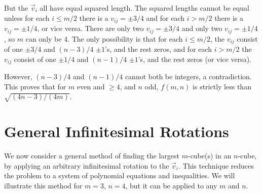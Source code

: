 But the $\vec{v}_i$ all have equal squared length.  The squared lengths cannot
be equal unless for each $i \leq m/2$ there is a $v_{ij} = \pm 3/4$ and for
each $i > m/2$ there is a $v_{ij} = \pm 1/4$, or vice versa.  There are only
two $v_{ij} = \pm 3/4$ and only two $v_{ij} = \pm 1/4$, so $m$ can only be 4.
The only possibility is that for each $i \leq m/2$, the $v_{ij}$ consist of
one $\pm 3/4$ and $(n-3)/4$ $\pm 1$'s, and the rest zeros, and for each $i >
m/2$ the $v_{ij}$ consist of one $\pm 1/4$ and $(n-1)/4$ $\pm 1$'s, and the
rest zeros (or vice versa).

However, $(n-3)/4$ and $(n-1)/4$ cannot both be integers, a contradiction.
This proves that for $m$ even and $\geq 4$, and $n$ odd, $f(m,n)$ is strictly
less than $\sqrt{(4n-3)/(4m)}$.

\section*{General Infinitesimal Rotations}

We now consider a general method of finding the largest $m$-cube(s)
in an $n$-cube, by applying an arbitrary infinitesimal rotation to
the $\vec{v}_i$. This technique reduces the problem to a system of polynomial
equations and inequalities. We will illustrate this method for $m = 3$, $n =
4$, but it can be applied to any $m$ and $n$.

